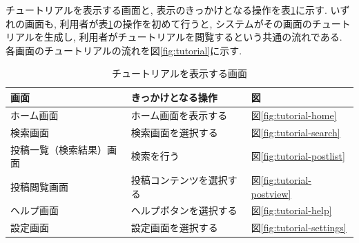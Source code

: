 チュートリアルを表示する画面と, 表示のきっかけとなる操作を表\ref{tab:tutorial}に示す.
いずれの画面も, 利用者が表\ref{tab:tutorial}の操作を初めて行うと, システムがその画面のチュートリアルを生成し,
利用者がチュートリアルを閲覧するという共通の流れである.
各画面のチュートリアルの流れを図\ref{fig:tutorial}に示す.

\begin{table}[htbp]
  \centering
  \caption{チュートリアルを表示する画面}
  \label{tab:tutorial}
  \begin{tabular}{lll}
    \toprule
    画面 & きっかけとなる操作 & 図 \\
    \midrule
    ホーム画面 & ホーム画面を表示する & 図\ref{fig:tutorial-home} \\
    検索画面 & 検索画面を選択する & 図\ref{fig:tutorial-search} \\
    投稿一覧（検索結果）画面 & 検索を行う & 図\ref{fig:tutorial-postlist} \\
    投稿閲覧画面 & 投稿コンテンツを選択する & 図\ref{fig:tutorial-postview} \\
    ヘルプ画面 & ヘルプボタンを選択する & 図\ref{fig:tutorial-help} \\
    設定画面 & 設定画面を選択する & 図\ref{fig:tutorial-settings} \\
    \bottomrule
  \end{tabular}
\end{table}

